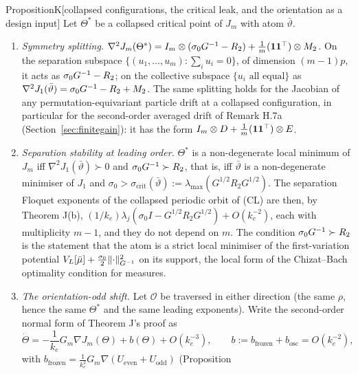 \begin{thm}{Proposition}{K}[collapsed configurations, the critical leak, and the orientation as a design input]
Let $\Theta^*$ be a collapsed critical point of $J_m$ with atom $\bar\vartheta$.
\begin{enumerate}[label=\textup{(\roman*)}]
  \item \emph{Symmetry splitting.}
    $\nabla^2J_m(\Theta^*) = I_m\otimes(\sigma_0G^{-1} - R_2) + \frac1m(\mathbf 1\mathbf 1^\top)\otimes M_2$. On the
    separation subspace $\{(u_1,\dots,u_m) : \sum_iu_i = 0\}$, of dimension $(m-1)p$, it acts as
    $\sigma_0G^{-1} - R_2$; on the collective subspace $\{u_i\text{ all equal}\}$ as
    $\nabla^2J_1(\bar\vartheta) = \sigma_0G^{-1} - R_2 + M_2$. The same splitting holds for the Jacobian of any
    permutation-equivariant particle drift at a collapsed configuration, in particular for the second-order averaged
    drift of Remark H.7a \textup{(}Section~\ref{sec:finitegain}\textup{)}: it has the form
    $I_m\otimes D + \frac1m(\mathbf 1\mathbf 1^\top)\otimes E$.
  \item \emph{Separation stability at leading order.} $\Theta^*$ is a non-degenerate local minimum of $J_m$ iff
    $\nabla^2J_1(\bar\vartheta)\succ0$ and $\sigma_0G^{-1}\succ R_2$, that is, iff $\bar\vartheta$ is a non-degenerate
    minimiser of $J_1$ and $\sigma_0 > \sigma_{\mathrm{crit}}(\bar\vartheta) := \lambda_{\max}(G^{1/2}R_2G^{1/2})$.
    The separation Floquet exponents of the collapsed periodic orbit of \textup{(CL)} are then, by Theorem J(b),
    $(1/k_e)\lambda_j(\sigma_0I - G^{1/2}R_2G^{1/2}) + O(k_e^{-2})$, each with multiplicity $m-1$, and they do not
    depend on $m$. The condition $\sigma_0G^{-1}\succ R_2$ is the statement that the atom is a strict local minimiser
    of the first-variation potential $V_L[\bar\mu] + \frac{\sigma_0}{2}\lVert \cdot\rVert^2_{G^{-1}}$ on its support, the
    local form of the Chizat--Bach optimality condition for measures.
  \item \emph{The orientation-odd shift.} Let $\mathcal O$ be traversed in either direction \textup{(}the same $\rho$,
    hence the same $\Theta^*$ and the same leading exponents\textup{)}. Write the second-order normal form of
    Theorem J's proof as
    \begin{equation}
      \dot\Theta = -\frac1{k_e}G_m\nabla J_m(\Theta) + b(\Theta) + O(k_e^{-3}),\qquad
      b := b_{\mathrm{frozen}} + b_{\mathrm{osc}} = O(k_e^{-2}),
      \tag{N}
    \end{equation}
    with $b_{\mathrm{frozen}} = \frac1{k_e^2}G_m\nabla(U_{\mathrm{even}} + U_{\mathrm{odd}})$ \textup{(}Proposition

\end{enumerate}
\end{thm}
